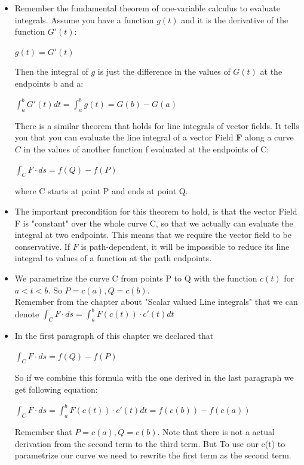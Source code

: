 \documentclass[12pt,a4paper]{article}
\begin{document}
	\begin{itemize}
		\item Remember the fundamental theorem of one-variable calculus to evaluate integrals. Assume you have a function $g(t)$ and it is the derivative of the function $G'(t)$:\\
		\begin{center}
			$g(t) = G'(t)$
		\end{center}
		Then the integral of $g$ is just the difference in the values of $G(t)$ at the endpoints b and a:\\
		\begin{center}
			$\int_{a}^{b} G'(t) dt =\int_{a}^{b} g(t) = G(b) - G(a)$
		\end{center}
		There is a similar theorem that holds for line integrals of vector fields. It tells you that you can evaluate the line integral of a vector Field \textbf{F} along a curve $C$ in the values of another function f evaluated at the endpoints of C:\\
		\begin{center}
			$\int_{C}^{}F \cdot ds = f(Q) - f(P)$
		\end{center}
		where C starts at point P and ends at point Q. 
		
		\item The important precondition for this theorem to hold, is that the vector Field F is "constant" over the whole curve C, so that we actually can evaluate the integral at two endpoints. This means that we require the vector field to be conservative. If $F$ is path-dependent, it will be impossible to reduce its line integral to values of a function at the path endpoints. 
		
		\item We parametrize the curve C from points P to Q with the function $c(t)$ for $a < t < b$. So $P = c(a), Q = c(b)$. \\
		Remember from the chapter about "Scalar valued Line integrals" that we can denote $\int_{C}^{} F\cdot ds = \int_{a}^{b} F(c(t))\cdot c'(t) dt$
		
		\item In the first paragraph of this chapter we declared that\\
		\begin{center}
			$\int_{C}^{}F \cdot ds = f(Q) - f(P)$
		\end{center}
		So if we combine this formula with the one derived in the last paragraph we get following equation:\\
		\begin{center}
			$\int_{C}^{}F \cdot ds = \int_{a}^{b} F(c(t)) \cdot c'(t)dt = f(c(b)) - f(c(a))$
		\end{center}
		Remember that $P = c(a), Q = c(b)$. Note that there is not a actual derivation from the second term to the third term. But To use our c(t) to parametrize our curve we need to rewrite the first term as the second term.
		

\end{itemize}
\end{document}
